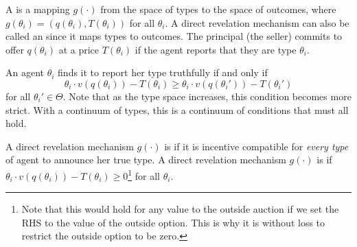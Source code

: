\documentclass[10pt]{article}
\begin{document}
\begin{definition}
	A  is a mapping $g(\cdot)$ from the space of types to the space of outcomes, where $g(\theta_i) = (q(\theta_i),T(\theta_i))$ for all $\theta_i$. A direct revelation mechanism can also be called an  since it maps types to outcomes. The principal (the seller) commits to offer $q(\theta_i)$ at a price $T(\theta_i)$ if the agent reports that they are type $\theta_i$.
\end{definition}

\begin{definition}
	An agent $\theta_i$ finds it  to report her type truthfully if and only if \[\theta_i \cdot v(q(\theta_i)) - T(\theta_i) \ge \theta_i\cdot  v(q(\theta_i')) - T(\theta_i')\]for all $\theta_i' \in \Theta$. Note that as the type space increases, this condition becomes more strict. With a continuum of types, this is a continuum of conditions that must all hold.
\end{definition}

\begin{definition}
	A direct revelation mechanism $g(\cdot)$ is  if it is incentive compatible for \emph{every type} of agent to announce her true type. A direct revelation mechanism $g(\cdot)$ is  if $\theta_i \cdot v(q(\theta_i)) - T(\theta_i) \ge 0$\footnote{Note that this would hold for any value to the outside auction if we set the RHS to the value of the outside option. This is why it is without loss to restrict the outside option to be zero.} for all $\theta_i$.
\end{definition}
\end{document}
